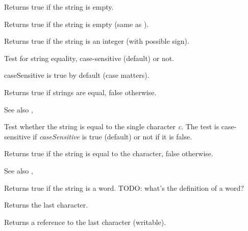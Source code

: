 \label{wxstringisempty}


Returns true if the string is empty.

\label{wxstringisnull}


Returns true if the string is empty (same as ).

\label{wxstringisnumber}


Returns true if the string is an integer (with possible sign).

\label{wxstringissameas}


Test for string equality, case-sensitive (default) or not.

caseSensitive is true by default (case matters).

Returns true if strings are equal, false otherwise.

See also , 


Test whether the string is equal to the single character {\it c}. The test is
case-sensitive if {\it caseSensitive} is true (default) or not if it is false.

Returns true if the string is equal to the character, false otherwise.

See also , 

\label{wxstringisword}


Returns true if the string is a word. TODO: what's the definition of a word?

\label{wxstringlast}


Returns the last character.


Returns a reference to the last character (writable).

